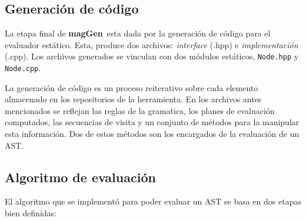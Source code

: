 \documentclass[runningheads,a4paper]{llncs}
\newcommand{\maggen}{\textbf{magGen}}
\begin{document}
\subsection{Generación de código}
\vspace{-0.22cm}
La etapa final de \maggen\ esta dada por la generación de código para el evaluador estático. Esta, produce dos archivos: \textit{interface} (.hpp) e \textit{implementación} (.cpp). Los archivos generados se vinculan con dos módulos estáticos, \texttt{Node.hpp} y \texttt{Node.cpp}.

La generación de código es un proceso reiterativo sobre cada elemento almacenado en los repositorios de la herramienta. En los archivos antes mencionados se reflejan las reglas de la gramatica, los planes de evaluación computados, las secuencias de visita y un conjunto de métodos para la manipular esta información. Dos de estos métodos son los encargados de la evaluación de un AST.

\subsection{Algoritmo de evaluación}
\label{sec:codcppalgeval}
\vspace{-0.22cm}
El algoritmo que se implementó para poder evaluar un AST se basa en dos etapas bien definidas:
\end{document}
